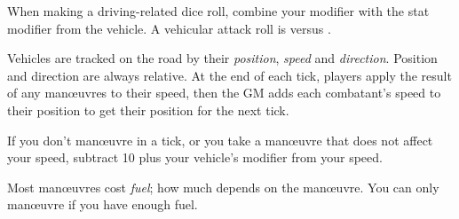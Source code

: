 
When making a driving-related dice roll, combine your  modifier with the stat modifier from the vehicle. A vehicular attack roll is  versus .

Vehicles are tracked on the road by their \emph{position}, \emph{speed} and \emph{direction}. Position and direction are always relative. At the end of each tick, players apply the result of any man\oe{}uvres to their speed, then the GM adds each combatant's speed to their position to get their position for the next tick.

If you don't man\oe{}uvre in a tick, or you take a man\oe{}uvre that does not affect your speed, subtract 10 plus your vehicle's  modifier from your speed.

Most man\oe{}uvres cost \emph{fuel}; how much depends on the man\oe{}uvre. You can only man\oe{}uvre if you have enough fuel.
